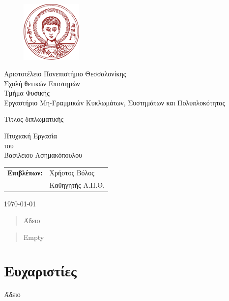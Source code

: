 \begin{titlepage}
	
\begin{figure}[H]
		\begin{center}
			\includegraphics[width=3cm]{LateX images/auth}
			\label{fig:cover_auth_logo}
		\end{center}
	\end{figure}
	
	\centering
	\Large Αριστοτέλειο Πανεπιστήμιο Θεσσαλονίκης\\
	\Large Σχολή θετικών Επιστημών\\
	\large Τμήμα Φυσικής\\
	\large Εργαστήριο Μη-Γραμμικών Κυκλωμάτων, Συστημάτων και Πολυπλοκότητας
	
	\vspace{\fill}
	
	\LARGE Τίτλος διπλωματικής
	
	\vspace{\fill}
	
	\Large Πτυχιακή Εργασία\\
	\Large του\\
	\Large Βασίλειου Ασημακόπουλου
	
	\vspace{\fill}
	\raggedright
	
	\begin{tabular}{ll}
		\textbf{Επιβλέπων:} & Χρήστος Βόλος\\
		& Καθηγητής Α.Π.Θ.\\
	\end{tabular}
	
	\centering
	\vspace{\fill}
	\today
	
\end{titlepage}

\begin{abstract}
	Άδειο
\end{abstract}

\begin{otherlanguage}{english} 
\begin{abstract}
	Empty
\end{abstract}
\end{otherlanguage}
\thispagestyle{empty}


\section*{Ευχαριστίες}
\thispagestyle{empty}

Άδειο

\clearpage

